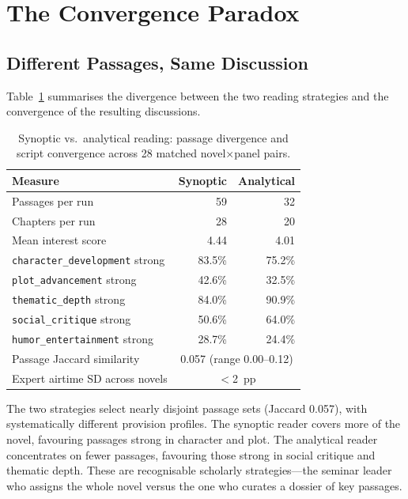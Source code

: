 \documentclass[final]{clv2025}
\begin{document}
\section{The Convergence Paradox}
\label{sec:convergence}

\subsection{Different Passages, Same Discussion}

Table~\ref{tab:convergence} summarises the divergence between the two
reading strategies and the convergence of the resulting discussions.

\begin{table}[t]
\centering
\small
\caption{Synoptic vs.\ analytical reading: passage divergence and
script convergence across 28 matched novel$\times$panel pairs.}
\label{tab:convergence}
\begin{tabular}{lrr}
\toprule
Measure & Synoptic & Analytical \\
\midrule
Passages per run & 59 & 32 \\
Chapters per run & 28 & 20 \\
Mean interest score & 4.44 & 4.01 \\
\addlinespace
\texttt{character\_development} strong & 83.5\% & 75.2\% \\
\texttt{plot\_advancement} strong & 42.6\% & 32.5\% \\
\texttt{thematic\_depth} strong & 84.0\% & 90.9\% \\
\texttt{social\_critique} strong & 50.6\% & 64.0\% \\
\texttt{humor\_entertainment} strong & 28.7\% & 24.4\% \\
\addlinespace
Passage Jaccard similarity & \multicolumn{2}{c}{0.057 (range 0.00--0.12)} \\
Expert airtime SD across novels & \multicolumn{2}{c}{$<$2~pp} \\
\bottomrule
\end{tabular}
\end{table}

The two strategies select nearly disjoint passage sets (Jaccard 0.057),
with systematically different provision profiles.  The synoptic reader
covers more of the novel, favouring passages strong in character and
plot.  The analytical reader concentrates on fewer passages, favouring
those strong in social critique and thematic depth.  These are
recognisable scholarly strategies---the seminar leader who assigns the
whole novel versus the one who curates a dossier of key passages.
\end{document}
